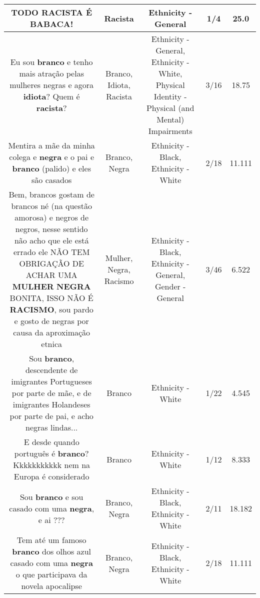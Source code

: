 \documentclass[11pt]{article}
\newlength\mylength
\begin{document}
\begin{center}
\begin{longtable}{|C{.65\mylength}|C{.30\mylength}|C{.12\mylength}|C{.12\mylength}|C{.12\mylength}|}
  \small TODO \textbf{RACISTA} É BABACA!\normalsize   & Racista & Ethnicity - General & 1/4 & 25.0 \\  \hline
  \small Eu sou \textbf{branco} e tenho mais atração pelas mulheres negras e agora \textbf{idiota}? Quem é \textbf{racista}?\normalsize   & Branco, Idiota, Racista & Ethnicity - General, Ethnicity - White, Physical Identity - Physical (and Mental) Impairments & 3/16 & 18.75 \\  \hline
  \small Mentira a mãe da minha colega e \textbf{negra} e o pai e \textbf{branco} (palido) e eles são casados\normalsize   & Branco, Negra & Ethnicity - Black, Ethnicity - White & 2/18 & 11.111 \\  \hline
  \small Bem, brancos gostam de brancos né (na questão amorosa) e negros de negros, nesse sentido não acho que ele está errado ele NÃO TEM OBRIGAÇÃO DE ACHAR UMA \textbf{MULHER} \textbf{NEGRA} BONITA, ISSO NÃO É \textbf{RACISMO}, sou pardo e gosto de negras por causa da aproximação etnica\normalsize   & Mulher, Negra, Racismo & Ethnicity - Black, Ethnicity - General, Gender - General & 3/46 & 6.522 \\  \hline
  \small Sou \textbf{branco}, descendente de imigrantes Portugueses por parte de mãe, e de imigrantes Holandeses por parte de pai, e acho negras lindas...\normalsize   & Branco & Ethnicity - White & 1/22 & 4.545 \\  \hline
  \small E desde quando português é \textbf{branco}? Kkkkkkkkkkk nem na Europa é considerado\normalsize   & Branco & Ethnicity - White & 1/12 & 8.333 \\  \hline
  \small Sou \textbf{branco} e sou casado com uma \textbf{negra}, e ai ???\normalsize   & Branco, Negra & Ethnicity - Black, Ethnicity - White & 2/11 & 18.182 \\  \hline
  \small Tem até um famoso \textbf{branco} dos olhos azul casado com uma \textbf{negra} o que participava da novela apocalipse\normalsize   & Branco, Negra & Ethnicity - Black, Ethnicity - White & 2/18 & 11.111 \\  \hline

\end{longtable}
\end{center}
\end{document}
